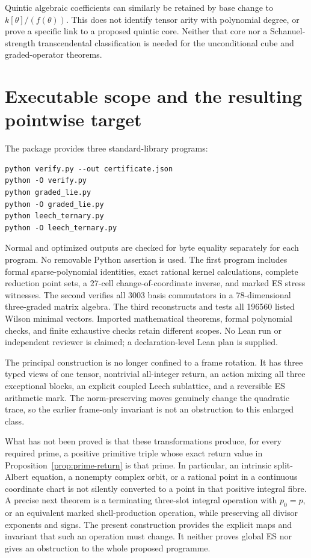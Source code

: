 \documentclass[11pt,reqno]{amsart}
\theoremstyle{definition}\newtheorem{definition}[theorem]{Definition}
\theoremstyle{remark}\newtheorem{remark}[theorem]{Remark}
\begin{document}
Quintic algebraic coefficients can similarly be retained by base change to
$k[\theta]/(f(\theta))$. This does not identify tensor arity with polynomial
degree, or prove a specific link to a proposed quintic core. Neither that core
nor a Schanuel-strength transcendental classification is needed for the
unconditional cube and graded-operator theorems.

\section{Executable scope and the resulting pointwise target}

The package provides three standard-library programs:
\begin{verbatim}
python verify.py --out certificate.json
python -O verify.py
python graded_lie.py
python -O graded_lie.py
python leech_ternary.py
python -O leech_ternary.py
\end{verbatim}
Normal and optimized outputs are checked for byte equality separately for each
program. No removable Python assertion is used. The first program includes
formal sparse-polynomial identities, exact rational kernel calculations,
complete reduction point sets, a 27-cell change-of-coordinate inverse, and
marked ES stress witnesses. The second verifies all 3003 basis commutators in
a 78-dimensional three-graded matrix algebra. The third reconstructs and tests
all 196560 listed Wilson minimal vectors. Imported mathematical theorems,
formal polynomial checks, and finite exhaustive checks retain different scopes.
No Lean run or independent reviewer is claimed; a declaration-level Lean plan
is supplied.

The principal construction is no longer confined to a frame rotation. It has
three typed views of one tensor, nontrivial all-integer return, an action mixing
all three exceptional blocks, an explicit coupled Leech sublattice, and a
reversible ES arithmetic mark. The norm-preserving moves genuinely change the
quadratic trace, so the earlier frame-only invariant is not an obstruction to
this enlarged class.

What has not been proved is that these transformations produce, for every
required prime, a positive primitive triple whose exact return value in
Proposition~\ref{prop:prime-return} is that prime. In particular, an intrinsic
split-Albert equation, a nonempty complex orbit, or a rational point in a
continuous coordinate chart is not silently converted to a point in that
positive integral fibre. A precise next theorem is a terminating three-slot
integral operation with $p_0=p$, or an equivalent marked shell-production
operation, while preserving all divisor exponents and signs. The present
construction provides the explicit maps and invariant that such an operation
must change. It neither proves global ES nor gives an obstruction to the
whole proposed programme.
\end{document}
